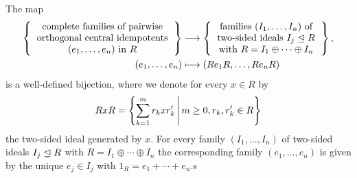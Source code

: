\begin{theorem}
  \label{theorem: correspondence central idempotents and direct decompositions}
  The map
  \begin{align*}
    \left\{
      \begin{tabular}{c}
        complete families of pairwise \\
        orthogonal central idempotents  \\
        $(e_1, \dotsc, e_n)$ in $R$
      \end{tabular}
    \right\}
    &\longto
      \left\{
      \begin{tabular}{c}
        families $(I_1, \dotsc, I_n)$ of  \\
        two-sided ideals $I_j \idealleq R$ \\
        with $R = I_1 \oplus \dotsb \oplus I_n$
      \end{tabular}
      \right\},
    \\
                  (e_1, \dotsc, e_n)
    &\longmapsto  (R e_1 R, \dotsc, R e_n R)
  \end{align*}
  is a well-defined bijection, where we denote for every $x \in R$ by
  \[
      R x R
    = \left\{
        \sum_{k=1}^m r_k x r'_k
      \suchthat*
        m \geq 0,
        r_k, r'_k \in R
      \right\}
  \]
  the two-sided ideal generated by $x$.
  For every family  $(I_1, \dotsc, I_n)$ of two-sided ideals $I_j \trianglelefteq R$ with $R = I_1 \oplus \dotsb \oplus I_n$ the corresponding family $(e_1, \dotsc, e_n)$ is given by the unique $e_j \in I_j$ with $1_R = e_1 + \dotsb + e_n$.s
\end{theorem}




